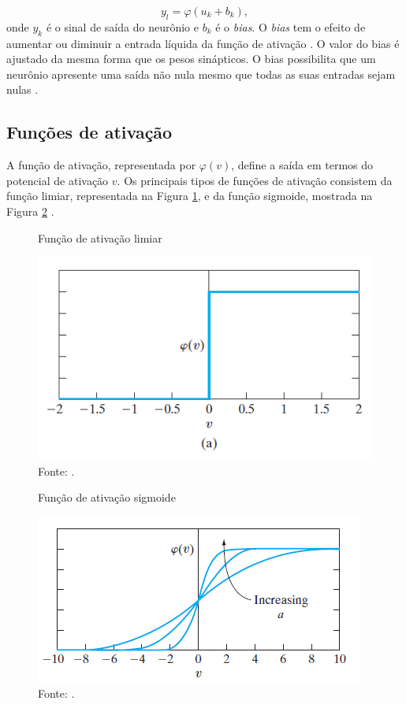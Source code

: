\begin{equation}
	y_l = \varphi(u_k + b_k),
\end{equation}
onde $y_k$ é o sinal de saída do neurônio e $b_k$ é o \textit{bias}. O \textit{bias} tem o efeito de aumentar ou diminuir a entrada líquida da função de ativação \cite{haykin}. O valor do bias é ajustado da mesma forma que os pesos sinápticos. O bias possibilita que um neurônio apresente uma saída não nula mesmo que todas as suas entradas sejam nulas \cite{redesemc}.

\subsection{Funções de ativação}
\label{sec:funcao}
A função de ativação, representada por $\varphi(v)$, define a saída em termos do potencial de ativação $v$. Os principais tipos de funções de ativação consistem da função limiar, representada na Figura \ref{fig:limiar}, e da função sigmoide, mostrada na Figura \ref{fig:sigmoide} \cite{haykin}.

\begin{figure}[H]
	\vspace{4mm}
	\centering
	\caption{Função de ativação limiar}
	\label{fig:limiar}
	\includegraphics[scale=0.5]{imagens/limiar}
	\caption*{Fonte: .}
\end{figure}

\begin{figure}[H]
	\vspace{4mm}
	\centering
	\caption{Função de ativação sigmoide}
	\label{fig:sigmoide}
	\includegraphics[scale=0.7]{imagens/sigmoide}	
	\caption*{Fonte: .}
\end{figure}

